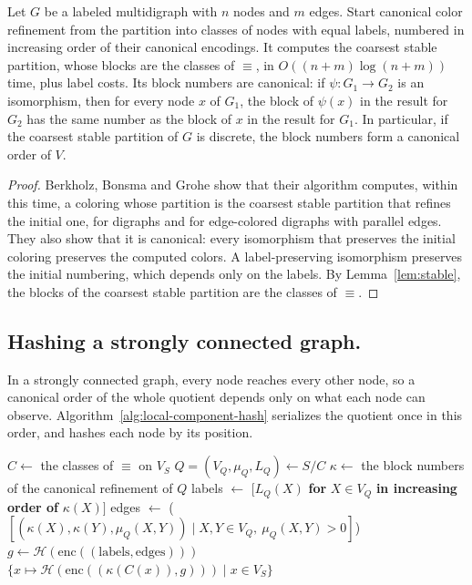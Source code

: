 \documentclass[twoside,leqno]{article}
\newcommand{\enc}{\mathrm{enc}}
\begin{document}
\begin{lemma}
\label{lem:canonical-refinement}
Let $G$ be a labeled multidigraph with $n$ nodes and $m$ edges. Start canonical color refinement from the partition into classes of nodes with equal labels, numbered in increasing order of their canonical encodings. It computes the coarsest stable partition, whose blocks are the classes of $\equiv$, in $O((n+m)\log(n+m))$ time, plus label costs. Its block numbers are canonical: if $\psi:G_1\to G_2$ is an isomorphism, then for every node $x$ of $G_1$, the block of $\psi(x)$ in the result for $G_2$ has the same number as the block of $x$ in the result for $G_1$. In particular, if the coarsest stable partition of $G$ is discrete, the block numbers form a canonical order of $V$.
\end{lemma}
\begin{proof}
Berkholz, Bonsma and Grohe show that their algorithm computes, within this time, a coloring whose partition is the coarsest stable partition that refines the initial one, for digraphs and for edge-colored digraphs with parallel edges. They also show that it is canonical: every isomorphism that preserves the initial coloring preserves the computed colors. A label-preserving isomorphism preserves the initial numbering, which depends only on the labels. By Lemma~\ref{lem:stable}, the blocks of the coarsest stable partition are the classes of $\equiv$.
\end{proof}


\subsection{Hashing a strongly connected graph.}
\label{sec:component-hash}
In a strongly connected graph, every node reaches every other node, so a canonical order of the whole quotient depends only on what each node can observe. Algorithm~\ref{alg:local-component-hash} serializes the quotient once in this order, and hashes each node by its position.

\begin{algorithm}[t]
    \caption{Local Component Hash}\label{alg:local-component-hash}
    \begin{algorithmic}[1]
     
        \State $C \gets$ the classes of $\equiv$ on $V_S$ 
        \State $Q=(V_Q,\mu_Q,L_Q) \gets S / C$ 
        \State $\kappa \gets$ the block numbers of the canonical refinement of $Q$ 
        \State labels $\gets$ $[L_Q(X)$ \textbf{for} $X\in V_Q$ \textbf{in increasing order of} $\kappa(X)]$
        \State edges $\gets$ ($[(\kappa(X), \kappa(Y), \mu_Q(X,Y)) \mid X,Y\in V_Q,\ \mu_Q(X,Y) > 0]$)
        \State $g \gets \mathcal{H}(\enc((\text{labels}, \text{edges})))$
        \State \Return $\{x \mapsto \mathcal{H}(\enc((\kappa(C(x)), g))) \mid x \in V_S\}$
    \EndFunction
    \end{algorithmic}
\end{algorithm}
\end{document}
